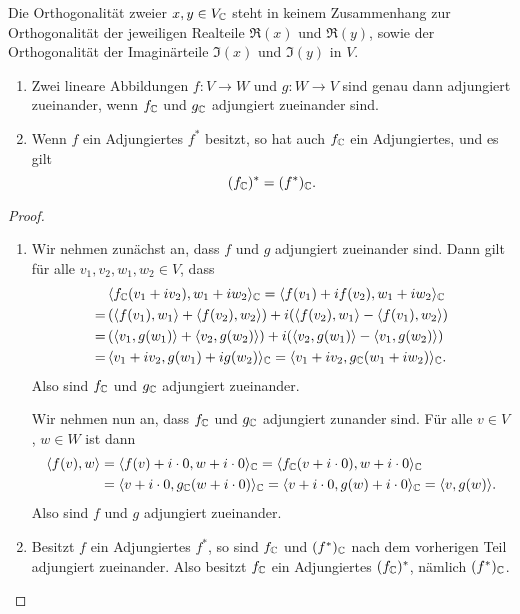 \documentclass[a4paper,10pt,numbers=noenddot]{scrartcl}
\begin{document}
\begin{warning}
  Die Orthogonalität zweier $x, y \in V_{\mathbb{C}}$ steht in keinem Zusammenhang zur Orthogonalität der jeweiligen Realteile $\Re(x)$ und $\Re(y)$, sowie der Orthogonalität der Imaginärteile $\Im(x)$ und $\Im(y)$ in $V$.
\end{warning}


\begin{proposition}\label{prop: complexification has adjoints}
  \begin{enumerate}[leftmargin=*]
    \item
      Zwei lineare Abbildungen $f \colon V \to W$ und $g \colon W \to V$ sind genau dann adjungiert zueinander, wenn $f_{\mathbb{C}}$ und $g_{\mathbb{C}}$ adjungiert zueinander sind.
    \item
      Wenn $f$ ein Adjungiertes $f^*$ besitzt, so hat auch $f_{\mathbb{C}}$ ein Adjungiertes, und es gilt
      \[
        (f_{\mathbb{C}})^* = (f^*)_{\mathbb{C}}.
      \]
  \end{enumerate}
\end{proposition}


\begin{proof}
  \begin{enumerate}[leftmargin=*]
    \item
      Wir nehmen zunächst an, dass $f$ und $g$ adjungiert zueinander sind.
      Dann gilt für alle $v_1, v_2, w_1, w_2 \in V$, dass
      \begin{align*}
        &\,  \langle  f_{\mathbb{C}}( v_1 + i v_2 ), w_1 + i w_2  \rangle_{\mathbb{C}}
        =     \langle  f(v_1) + i f(v_2), w_1 + i w_2 \rangle_{\mathbb{C}} \\
        =&\,  (\langle f(v_1), w_1 \rangle + \langle f(v_2), w_2 \rangle) + i(\langle f(v_2), w_1 \rangle - \langle f(v_1), w_2 \rangle) \\
        =&\,  (\langle v_1, g(w_1) \rangle + \langle v_2, g(w_2) \rangle) + i(\langle v_2, g(w_1) \rangle - \langle v_1, g(w_2) \rangle) \\
        =&\,  \langle  v_1 + i v_2, g(w_1) + i g(w_2)  \rangle_{\mathbb{C}}
        =     \langle  v_1 + i v_2, g_{\mathbb{C}}( w_1 + i w_2 )  \rangle_{\mathbb{C}}.
      \end{align*}
      Also sind $f_{\mathbb{C}}$ und $g_{\mathbb{C}}$ adjungiert zueinander.
      
      Wir nehmen nun an, dass $f_{\mathbb{C}}$ und $g_{\mathbb{C}}$ adjungiert zunander sind.
      Für alle $v \in V$, $w \in W$ ist dann
      \begin{align*}
            \langle f(v), w \rangle
        &=  \langle f(v) + i \cdot 0, w + i \cdot 0 \rangle_{\mathbb{C}}
         =  \langle f_{\mathbb{C}}(v + i \cdot 0), w + i \cdot 0 \rangle_{\mathbb{C}} \\
        &=  \langle v + i \cdot 0, g_{\mathbb{C}}(w + i \cdot 0) \rangle_{\mathbb{C}}
         =  \langle v + i \cdot 0, g(w) + i \cdot 0 \rangle_{\mathbb{C}}
         =  \langle v, g(w) \rangle.
      \end{align*}
      Also sind $f$ und $g$ adjungiert zueinander.
      
    \item
      Besitzt $f$ ein Adjungiertes $f^*$, so sind $f_{\mathbb{C}}$ und $(f^*)_{\mathbb{C}}$ nach dem vorherigen Teil adjungiert zueinander.
      Also besitzt $f_{\mathbb{C}}$ ein Adjungiertes $(f_{\mathbb{C}})^*$, nämlich $(f^*)_{\mathbb{C}}$.
    \qedhere
  \end{enumerate}
\end{proof}
\end{document}
